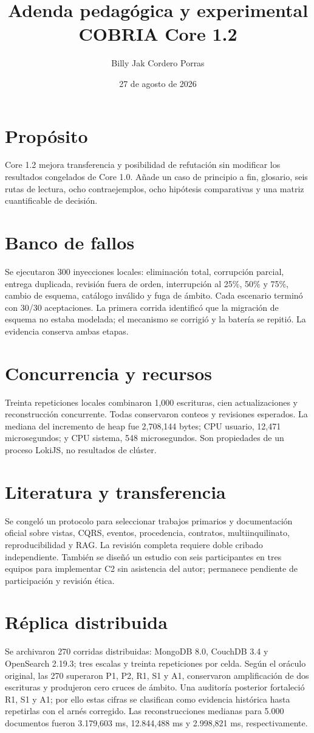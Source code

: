\documentclass[11pt]{article}
\title{Adenda pedagógica y experimental\\COBRIA Core 1.2}
\author{Billy Jak Cordero Porras}\date{27 de agosto de 2026}
\begin{document}
\maketitle
\section*{Propósito}
Core 1.2 mejora transferencia y posibilidad de refutación sin modificar los resultados congelados de Core 1.0. Añade un caso de principio a fin, glosario, seis rutas de lectura, ocho contraejemplos, ocho hipótesis comparativas y una matriz cuantificable de decisión.

\section*{Banco de fallos}
Se ejecutaron 300 inyecciones locales: eliminación total, corrupción parcial, entrega duplicada, revisión fuera de orden, interrupción al 25\%, 50\% y 75\%, cambio de esquema, catálogo inválido y fuga de ámbito. Cada escenario terminó con 30/30 aceptaciones. La primera corrida identificó que la migración de esquema no estaba modelada; el mecanismo se corrigió y la batería se repitió. La evidencia conserva ambas etapas.

\section*{Concurrencia y recursos}
Treinta repeticiones locales combinaron 1,000 escrituras, cien actualizaciones y reconstrucción concurrente. Todas conservaron conteos y revisiones esperados. La mediana del incremento de heap fue 2,708,144 bytes; CPU usuario, 12,471 microsegundos; y CPU sistema, 548 microsegundos. Son propiedades de un proceso LokiJS, no resultados de clúster.

\section*{Literatura y transferencia}
Se congeló un protocolo para seleccionar trabajos primarios y documentación oficial sobre vistas, CQRS, eventos, procedencia, contratos, multiinquilinato, reproducibilidad y RAG. La revisión completa requiere doble cribado independiente. También se diseñó un estudio con seis participantes en tres equipos para implementar C2 sin asistencia del autor; permanece pendiente de participación y revisión ética.

\section*{Réplica distribuida}
Se archivaron 270 corridas distribuidas: MongoDB 8.0, CouchDB 3.4 y OpenSearch 2.19.3; tres escalas y treinta repeticiones por celda. Según el oráculo original, las 270 superaron P1, P2, R1, S1 y A1, conservaron amplificación de dos escrituras y produjeron cero cruces de ámbito. Una auditoría posterior fortaleció R1, S1 y A1; por ello estas cifras se clasifican como evidencia histórica hasta repetirlas con el arnés corregido. Las reconstrucciones medianas para 5.000 documentos fueron 3.179,603 ms, 12.844,488 ms y 2.998,821 ms, respectivamente.
\end{document}
